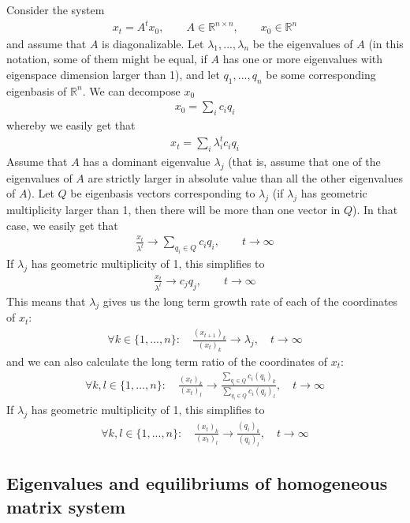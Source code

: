 \documentclass[12pt]{article}
\begin{document}
Consider the system 
\begin{align}
x_t = A^t x_0,\qquad A\in \mathbb{R}^{n \times n},\qquad x_0 \in \mathbb{R}^n
\end{align}
and assume that $A$ is diagonalizable. Let $\lambda_1,...,\lambda_n$ be the eigenvalues of $A$ (in this notation, some of them might be equal, if $A$ has one or more eigenvalues with eigenspace dimension larger than 1), and let $q_1,...,q_n$ be some corresponding eigenbasis of $\mathbb{R}^n$. We can decompose $x_0$
\begin{align}
x_0 = \sum_i c_i q_i
\end{align}
whereby we easily get that
\begin{align}
x_t = \sum_i \lambda_i^t c_i q_i
\end{align}
Assume that $A$ has a dominant eigenvalue $\lambda_j$ (that is, assume that one of the eigenvalues of $A$ are strictly larger in absolute value than all the other eigenvalues of $A$). Let $Q$ be eigenbasis vectors corresponding to $\lambda_j$ (if $\lambda_j$ has geometric multiplicity larger than 1, then there will be more than one vector in $Q$). In that case, we easily get that
\begin{align}
\frac{x_t}{\lambda^t} \to \sum_{q_i \in Q} c_i q_i, \qquad t\to \infty
\end{align}
If $\lambda_j$ has geometric multiplicity of 1, this simplifies to
\begin{align}
\frac{x_t}{\lambda^t} \to c_j q_j, \qquad t\to \infty
\end{align}
This means that $\lambda_j$ gives us the long term growth rate of each of the coordinates of $x_t$:
\begin{align}
\forall k \in \{1,...,n\}:\quad \frac{(x_{t+1})_k}{(x_{t})_k} \to \lambda_j, \quad t\to \infty
\end{align}
and we can also calculate the long term ratio of the coordinates of $x_t$:
\begin{align}
\forall k,l \in \{1,...,n\}:\quad \frac{(x_{t})_k}{(x_{t})_l} \to \frac{ \sum_{q_i \in Q} c_i (q_i)_k}{ \sum_{q_i \in Q} c_i (q_i)_l}, \quad t\to \infty
\end{align}
If $\lambda_j$ has geometric multiplicity of 1, this simplifies to
\begin{align}
\forall k,l \in \{1,...,n\}:\quad \frac{(x_{t})_k}{(x_{t})_l} \to \frac{ (q_i)_k}{ (q_i)_l}, \quad t\to \infty
\end{align}

\subsection{Eigenvalues and equilibriums of homogeneous matrix system}
\end{document}
